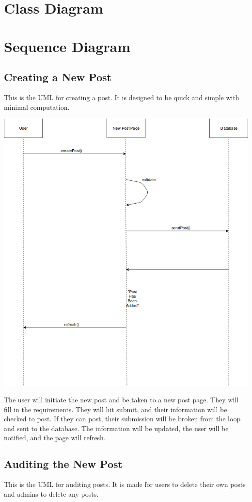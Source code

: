 \documentclass[12pt]{article}
\begin{document}
\section{Class Diagram}

\section{Sequence Diagram}
\subsection{Creating a New Post}
This is the UML for creating a post. It is designed to be quick and simple with minimal computation.

\includegraphics[scale=0.85]{img/createPost}

The user will initiate the new post and be taken to a new post page. They will fill in the requirements. They will hit submit, and their information will be checked to post. If they can post, their submission will be broken from the loop and sent to the database. The information will be updated, the user will be notified, and the page will refresh.
\subsection{Auditing the New Post}
This is the UML for auditing posts. It is made for users to delete their own posts and admins to delete any posts.
\end{document}
